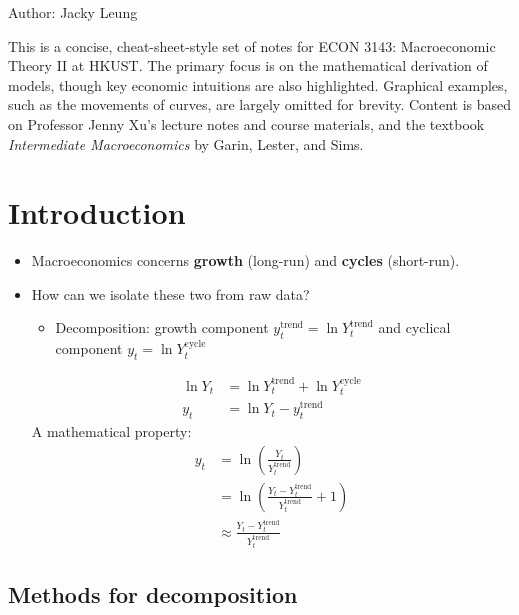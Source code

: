 \documentclass[notitlepage]{article}
\begin{document}
Author: Jacky Leung

This is a concise, cheat-sheet-style set of notes for ECON 3143: Macroeconomic Theory II at HKUST. The primary focus is on the mathematical derivation of models, though key economic intuitions are also highlighted. Graphical examples, such as the movements of curves, are largely omitted for brevity. Content is based on Professor Jenny Xu's lecture notes and course materials, and the textbook \textit{Intermediate Macroeconomics} by Garin, Lester, and Sims.

\section{Introduction}

\begin{itemize}
\item Macroeconomics concerns \textbf{growth} (long-run) and \textbf{cycles} (short-run).
\item How can we isolate these two from raw data?
\begin{itemize}
    \item Decomposition: growth component $y^{\text{trend}}_t = \ln Y_t^\text{trend}$ and cyclical component $y_t = \ln Y_t^\text{cycle}$
\end{itemize}
\begin{align*}
\ln Y_t &= \ln Y_t^\text{trend} + \ln Y_t^\text{cycle} \\
y_t &= \ln Y_t - y^{\text{trend}}_t
\end{align*}
A mathematical property:
\begin{align*}
y_t &= \ln\left(\frac{Y_t}{Y_t^{\text{trend}}}\right) \\
&= \ln\left(\frac{Y_t - Y_t^{\text{trend}}}{Y_t^{\text{trend}}} + 1\right) \\
&\approx \frac{Y_t - Y_t^{\text{trend}}}{Y_t^{\text{trend}}}
\end{align*}
\end{itemize}

\subsection{Methods for decomposition}
\end{document}
